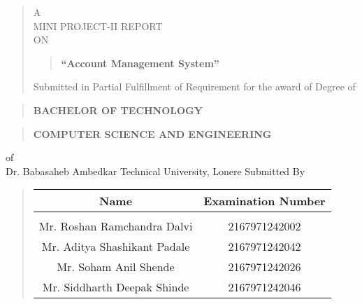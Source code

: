 \documentclass[12pt]{report}
\author{}
\date{}
\begin{document}
	\large
	\centering
	
	\begin{quote}
		\large
		\centering
		A\\MINI PROJECT-II REPORT\\ON
		
		\begin{quote}
			\centering
			
			\textbf{``Account Management System''}
		\end{quote}
		
		Submitted in Partial Fulfillment of Requirement for the award of
		Degree of
	\end{quote}
	
	\begin{quote}
		\centering
		\large
		\textbf{BACHELOR OF TECHNOLOGY}
	\end{quote}
	
	\begin{quote}
		\large
		\centering
		\textbf{COMPUTER SCIENCE AND ENGINEERING}\\
	\end{quote}
	of\\
	Dr. Babasaheb Ambedkar Technical University, Lonere
	Submitted By
	\vspace{0.5cm}
	\begin{quote}
		\normalsize
		\centering
		\begin{table}[ht]
			\centering
			\begin{tabular}{ c  c }
				
				\bfseries
				Name & \bfseries Examination Number \\[1ex]
				\hline\\[1ex]
					Mr. Roshan Ramchandra Dalvi & 2167971242002\\[1ex]
				Mr. Aditya Shashikant Padale & 2167971242042\\[1ex]
				Mr. Soham Anil Shende & 2167971242026\\[1ex]
				Mr. Siddharth Deepak Shinde & 2167971242046\\[1ex]
			
				
			\end{tabular}
		\end{table}
	\end{quote}
	
\end{document}
